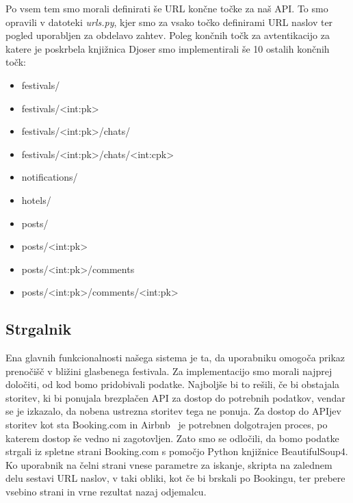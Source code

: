 \documentclass[a4paper,12pt,openright]{book}
\begin{document}
Po vsem tem smo morali definirati še URL končne točke za naš API.
To smo opravili v datoteki \textit{urls.py}, kjer smo za vsako točko definirami URL naslov ter pogled uporabljen za obdelavo zahtev.
Poleg končnih točk za avtentikacijo za katere je poskrbela knjižnica Djoser smo implementirali še 10 ostalih končnih točk:
\begin{itemize}
    \item festivals/
    \item festivals/\textless int:pk\textgreater
    \item festivals/\textless int:pk\textgreater/chats/
    \item festivals/\textless int:pk\textgreater/chats/\textless int:cpk\textgreater
    \item notifications/
    \item hotels/
    \item posts/
    \item posts/\textless int:pk\textgreater
    \item posts/\textless int:pk\textgreater/comments
    \item posts/\textless int:pk\textgreater/comments/\textless int:pk\textgreater
\end{itemize}

\subsection{Strgalnik}
Ena glavnih funkcionalnosti našega sistema je ta, da uporabniku omogoča prikaz preno\-čišč v bližini glasbenega festivala.
Za implementacijo smo morali najprej določiti, od kod bomo pridobivali podatke.
Najboljše bi to rešili, če bi obstajala storitev, ki bi ponujala brezplačen API za dostop do potrebnih podatkov, vendar se je izkazalo, da nobena ustrezna storitev tega ne ponuja.
Za dostop do APIjev storitev kot sta Booking.com in Airbnb~\cite{airbnbapi} je potrebnen dolgotrajen proces, po katerem dostop še vedno ni zagotovljen.
Zato smo se odločili, da bomo podatke strgali iz spletne strani Booking.com s pomočjo Python knjižnice BeautifulSoup4.
Ko uporabnik na čelni strani vnese parametre za iskanje, skripta na zalednem delu sestavi URL naslov, v taki obliki, kot če bi brskali po Bookingu, ter prebere vsebino strani in vrne rezultat nazaj odjemalcu.
\end{document}
